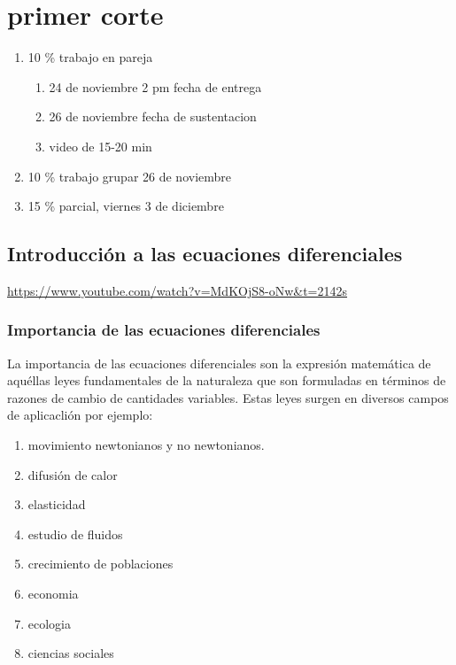 \documentclass{book}
\begin{document}
    \chapter{primer corte}
    \begin{enumerate}
        \item 10 \% trabajo en pareja\begin{enumerate}
            \item 24 de noviembre 2 pm fecha de entrega
            \item 26 de noviembre fecha de sustentacion 
            \item video de 15-20 min 
        \end{enumerate}
        \item 10 \% trabajo grupar 26 de noviembre 
        \item 15 \% parcial, viernes 3 de diciembre
    \end{enumerate}
    
    \section{Introducción a las ecuaciones diferenciales}
    \url{https://www.youtube.com/watch?v=MdKOjS8-oNw&t=2142s} 

    \subsection{Importancia de las ecuaciones diferenciales}
     La importancia de las ecuaciones diferenciales son la expresión
    matemática de aquéllas leyes fundamentales 
    de la naturaleza que son formuladas en términos de razones de cambio
    de cantidades variables.
    Estas leyes surgen en diversos campos de aplicaclión por ejemplo:

    \begin{enumerate}
        \item movimiento newtonianos y no newtonianos.
        \item difusión de calor
        \item elasticidad
        \item estudio de fluidos
        \item crecimiento de poblaciones 
        \item economia
        \item ecologia
        \item ciencias sociales 
    \end{enumerate}
\end{document}
